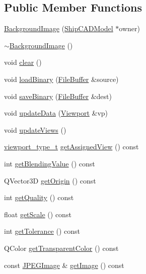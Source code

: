 \subsection*{Public Member Functions}
\begin{DoxyCompactItemize}
\item 
\hyperlink{classShipCAD_1_1BackgroundImage_a9ee3fc5f44c47b757f23baaeacd78553}{Background\-Image} (\hyperlink{classShipCAD_1_1ShipCADModel}{Ship\-C\-A\-D\-Model} $\ast$owner)
\item 
\hyperlink{classShipCAD_1_1BackgroundImage_ac36cf427a30ec243f55a2808488a3c7e}{$\sim$\-Background\-Image} ()
\item 
void \hyperlink{classShipCAD_1_1BackgroundImage_a9c25ab668820b7ba0ab59a061c28d2a0}{clear} ()
\item 
void \hyperlink{classShipCAD_1_1BackgroundImage_a72abed6b5cdbd287ec41c817acf84de9}{load\-Binary} (\hyperlink{classShipCAD_1_1FileBuffer}{File\-Buffer} \&source)
\item 
void \hyperlink{classShipCAD_1_1BackgroundImage_a5b6df7f94af9d32579888394b2f86f40}{save\-Binary} (\hyperlink{classShipCAD_1_1FileBuffer}{File\-Buffer} \&dest)
\item 
void \hyperlink{classShipCAD_1_1BackgroundImage_aebee3507d92cb5d6ca486c15313e0beb}{update\-Data} (\hyperlink{classShipCAD_1_1Viewport}{Viewport} \&vp)
\item 
void \hyperlink{classShipCAD_1_1BackgroundImage_a47bb9eeb69dbe6062392749ecaef2eb7}{update\-Views} ()
\item 
\hyperlink{namespaceShipCAD_aeeeb05810f2e31ef89fd4ac6b6ba9c0a}{viewport\-\_\-type\-\_\-t} \hyperlink{classShipCAD_1_1BackgroundImage_a4ed6b7b2a8a9d647c82a1e0c1fc52b9e}{get\-Assigned\-View} () const 
\item 
int \hyperlink{classShipCAD_1_1BackgroundImage_a85d654832400b02adeab512df7ef969c}{get\-Blending\-Value} () const 
\item 
Q\-Vector3\-D \hyperlink{classShipCAD_1_1BackgroundImage_a886fe351723011ea9ba85ccf055412d0}{get\-Origin} () const 
\item 
int \hyperlink{classShipCAD_1_1BackgroundImage_ad2f1eaa1a63c102b137f9aa7e2750a66}{get\-Quality} () const 
\item 
float \hyperlink{classShipCAD_1_1BackgroundImage_a66ebc90fd74efd91c77d27434031044d}{get\-Scale} () const 
\item 
int \hyperlink{classShipCAD_1_1BackgroundImage_a1435bf5a160f1ed1a0fd96debac70a87}{get\-Tolerance} () const 
\item 
Q\-Color \hyperlink{classShipCAD_1_1BackgroundImage_a62aae7fd8eb0551f214d483c7e52f30f}{get\-Transparent\-Color} () const 
\item 
const \hyperlink{structShipCAD_1_1JPEGImage}{J\-P\-E\-G\-Image} \& \hyperlink{classShipCAD_1_1BackgroundImage_a758e87c8ab9c85cfde9662ebc10831ce}{get\-Image} () const 
\end{DoxyCompactItemize}


